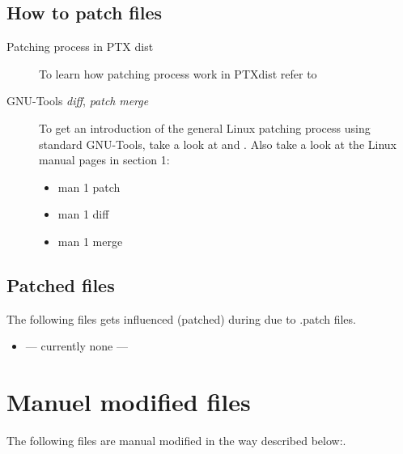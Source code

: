 \subsection{How to patch files}%
\label{sub:How to pach files}
\begin{description}
    \item[Patching process in PTX dist]
        To learn how patching process work in PTXdist refer to \cite{todo}
    \item[GNU-Tools \textit{diff},  \textit{patch} \textit{merge}] To get an
        introduction of the general Linux patching process using
        standard GNU-Tools, take a look at
        \cite[GNU Diff and Patch]{GNUPatchTools:Patch_Diff_Exaples} and
        \cite[GNU Merge]{GNUPatchTools:Merge_Examples}. Also take a look at the
        Linux manual pages in section 1:
        \begin{itemize}
            \item man 1 patch
            \item man 1 diff
            \item man 1 merge
        \end{itemize}
\end{description}

\subsection{Patched files}%
\label{sub:Patched fiels}
The following files gets influenced (patched) during due to .patch files.

\begin{itemize}
    \item --- currently none ---
\end{itemize}


\section{Manuel modified files}%
\label{sec:Manuel modified files}

The following files are manual modified in the way described below:.

